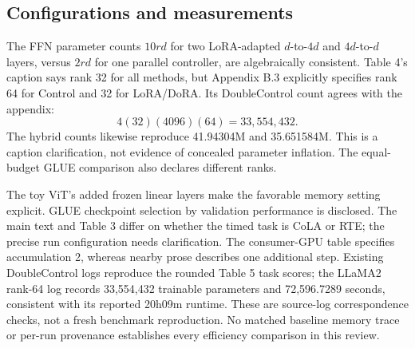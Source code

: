 \documentclass[10pt]{article}
\begin{document}
\subsection*{Configurations and measurements}
The FFN parameter counts \(10rd\) for two LoRA-adapted \(d\)-to-\(4d\) and \(4d\)-to-\(d\) layers, versus \(2rd\) for one parallel controller, are algebraically consistent. Table 4’s caption says rank 32 for all methods, but Appendix B.3 explicitly specifies rank 64 for Control and 32 for LoRA/DoRA. Its DoubleControl count agrees with the appendix: \[4(32)(4096)(64)=33{,}554{,}432.\] The hybrid counts likewise reproduce 41.94304M and 35.651584M. This is a caption clarification, not evidence of concealed parameter inflation. The equal-budget GLUE comparison also declares different ranks.\par
The toy ViT’s added frozen linear layers make the favorable memory setting explicit. GLUE checkpoint selection by validation performance is disclosed. The main text and Table 3 differ on whether the timed task is CoLA or RTE; the precise run configuration needs clarification. The consumer-GPU table specifies accumulation 2, whereas nearby prose describes one additional step. Existing DoubleControl logs reproduce the rounded Table 5 task scores; the LLaMA2 rank-64 log records 33,554,432 trainable parameters and 72,596.7289 seconds, consistent with its reported 20h09m runtime. These are source-log correspondence checks, not a fresh benchmark reproduction. No matched baseline memory trace or per-run provenance establishes every efficiency comparison in this review.\par
\end{document}
